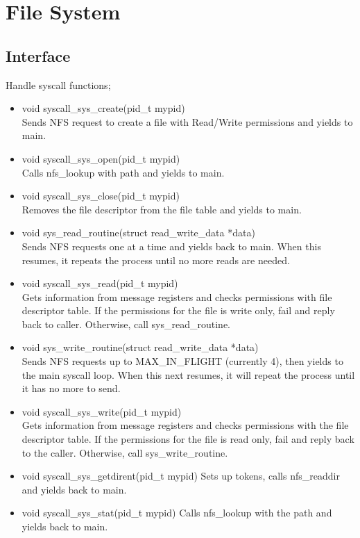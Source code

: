\documentclass[12pt]{article}
\begin{document}
\clearpage
\section{File System}
\subsection{Interface}
Handle syscall functions;
\begin{itemize}
\item void syscall\_sys\_create(pid\_t mypid)\\
Sends NFS request to create a file with Read/Write permissions and yields to main.
\item void syscall\_sys\_open(pid\_t mypid)\\
Calls nfs\_lookup with path and yields to main.
\item void syscall\_sys\_close(pid\_t mypid)\\
Removes the file descriptor from the file table and yields to main.
\item void sys\_read\_routine(struct read\_write\_data *data)\\
Sends NFS requests one at a time and yields back to main. When this resumes, it repeats the process until no more reads are needed.
\item void syscall\_sys\_read(pid\_t mypid)\\
Gets information from message registers and checks permissions with file descriptor table. If the permissions for the file is write only, fail and reply back to caller. Otherwise, call sys\_read\_routine.
\item void sys\_write\_routine(struct read\_write\_data *data)\\
Sends NFS requests up to MAX\_IN\_FLIGHT (currently 4), then yields to the main syscall loop. When this next resumes, it will repeat the process until it has no more to send.
\item void syscall\_sys\_write(pid\_t mypid)\\
Gets information from message registers and checks permissions with the file descriptor table. If the permissions for the file is read only, fail and reply back to the caller. Otherwise, call sys\_write\_routine.
\item void syscall\_sys\_getdirent(pid\_t mypid)
Sets up tokens, calls nfs\_readdir and yields back to main.
\item void syscall\_sys\_stat(pid\_t mypid)
Calls nfs\_lookup with the path and yields back to main.
\end{itemize}
\end{document}
